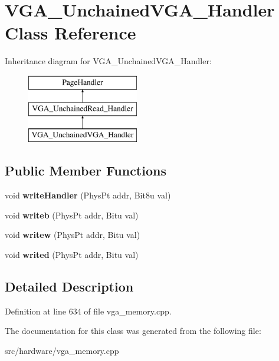 \hypertarget{classVGA__UnchainedVGA__Handler}{\section{V\-G\-A\-\_\-\-Unchained\-V\-G\-A\-\_\-\-Handler Class Reference}
\label{classVGA__UnchainedVGA__Handler}
}
Inheritance diagram for V\-G\-A\-\_\-\-Unchained\-V\-G\-A\-\_\-\-Handler\-:\begin{figure}[H]
\begin{center}
\leavevmode
\includegraphics[height=3.000000cm]{classVGA__UnchainedVGA__Handler}
\end{center}
\end{figure}
\subsection*{Public Member Functions}
\begin{DoxyCompactItemize}
\item 
\hypertarget{classVGA__UnchainedVGA__Handler_ad58a777dd74dd23e4a11a31383405926}{void {\bfseries write\-Handler} (Phys\-Pt addr, Bit8u val)}\label{classVGA__UnchainedVGA__Handler_ad58a777dd74dd23e4a11a31383405926}

\item 
\hypertarget{classVGA__UnchainedVGA__Handler_a5c1bc86d9e0874e6b738440ab1a46cab}{void {\bfseries writeb} (Phys\-Pt addr, Bitu val)}\label{classVGA__UnchainedVGA__Handler_a5c1bc86d9e0874e6b738440ab1a46cab}

\item 
\hypertarget{classVGA__UnchainedVGA__Handler_a52dbbef8deba1e3f29ec5ff924742dff}{void {\bfseries writew} (Phys\-Pt addr, Bitu val)}\label{classVGA__UnchainedVGA__Handler_a52dbbef8deba1e3f29ec5ff924742dff}

\item 
\hypertarget{classVGA__UnchainedVGA__Handler_aad4069e3c9c64274ae4ccd03851b2ca6}{void {\bfseries writed} (Phys\-Pt addr, Bitu val)}\label{classVGA__UnchainedVGA__Handler_aad4069e3c9c64274ae4ccd03851b2ca6}

\end{DoxyCompactItemize}


\subsection{Detailed Description}


Definition at line 634 of file vga\-\_\-memory.\-cpp.



The documentation for this class was generated from the following file\-:\begin{DoxyCompactItemize}
\item 
src/hardware/vga\-\_\-memory.\-cpp\end{DoxyCompactItemize}

